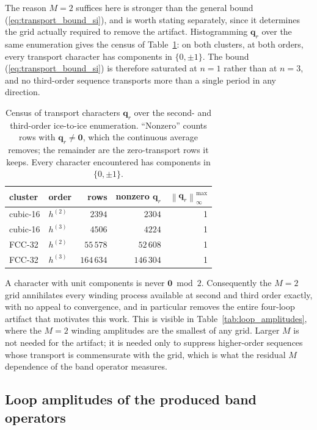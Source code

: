 \documentclass[aps,prl,onecolumn,amsmath,amssymb]{revtex4-2}
\newcommand{\bq}{\bm q}
\begin{document}
The reason $M=2$ suffices here is stronger than the general bound
(\ref{eq:transport_bound_si}), and is worth stating separately, since it
determines the grid actually required to remove the artifact.  Histogramming
$\bq_r$ over the same enumeration gives the census of
Table~\ref{tab:transport_census}: on both clusters, at both orders, every
transport character has components in $\{0,\pm1\}$.  The bound
(\ref{eq:transport_bound_si}) is therefore saturated at $n=1$ rather than at
$n=3$, and no third-order sequence transports more than a single period in any
direction.
\begin{table}[htbp]
\caption{Census of transport characters $\bq_r$ over the second- and
third-order ice-to-ice enumeration.  ``Nonzero'' counts rows with
$\bq_r\ne\bm0$, which the continuous average removes; the remainder are the
zero-transport rows it keeps.  Every character encountered has components in
$\{0,\pm1\}$.}
\label{tab:transport_census}
\centering
\begin{tabular}{llrrr}
\toprule
cluster & order & rows & nonzero $\bq_r$ &
$\left\|\bq_r\right\|_{\infty}^{\max}$\\
\midrule
cubic-16 & $h^{(2)}$ & $2394$ & $2304$ & 1\\
cubic-16 & $h^{(3)}$ & $4506$ & $4224$ & 1\\
FCC-32 & $h^{(2)}$ & $55\,578$ & $52\,608$ & 1\\
FCC-32 & $h^{(3)}$ & $164\,634$ & $146\,304$ & 1\\
\bottomrule
\end{tabular}
\end{table}

A character with unit components is never $\bm0\bmod2$.  Consequently the
$M=2$ grid annihilates every winding process available at second and third
order exactly, with no appeal to convergence, and in particular removes the
entire four-loop artifact that motivates this work.  This is visible in
Table~\ref{tab:loop_amplitudes}, where the $M=2$ winding amplitudes are the
smallest of any grid.  Larger $M$ is not needed for the artifact; it is needed
only to suppress higher-order sequences whose transport is commensurate with
the grid, which is what the residual $M$ dependence of the band operator
measures.

\subsection{Loop amplitudes of the produced band operators}
\end{document}
